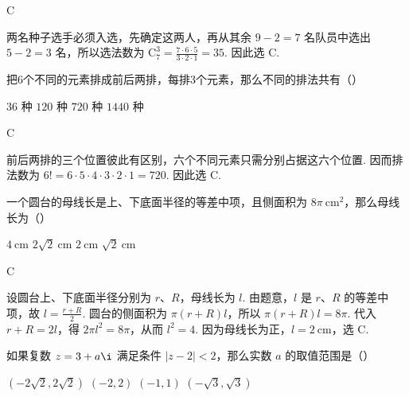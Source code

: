 \begin{answer}
C
\end{answer}

\begin{solution}
两名种子选手必须入选，先确定这两人，再从其余 \(9-2=7\) 名队员中选出 \(5-2=3\) 名，所以选法数为
\(\mathrm C_7^3=\frac{7\cdot6\cdot5}{3\cdot2\cdot1}=35\).
因此选 C.
\end{solution}

\begin{problem}
把6个不同的元素排成前后两排，每排3个元素，那么不同的排法共有（\quad）

\choices
    {\(36\) 种}
    {\(120\) 种}
    {\(720\) 种}
    {\(1440\) 种}
\end{problem}

\begin{answer}
C
\end{answer}

\begin{solution}
前后两排的三个位置彼此有区别，六个不同元素只需分别占据这六个位置. 因而排法数为
\(6!=6\cdot5\cdot4\cdot3\cdot2\cdot1=720\).
因此选 C.
\end{solution}

\begin{problem}
一个圆台的母线长是上、下底面半径的等差中项，且侧面积为 \(8\pi \mathrm{~cm}^2\)，那么母线长为（\quad）

\choices
    {\(4\mathrm{~cm}\)}
    {\(2\sqrt{2}\mathrm{~cm}\)}
    {\(2\mathrm{~cm}\)}
    {\(\sqrt{2}\mathrm{~cm}\)}
\end{problem}

\begin{answer}
C
\end{answer}

\begin{solution}
设圆台上、下底面半径分别为 \(r\)、\(R\)，母线长为 \(l\). 由题意，\(l\) 是 \(r\)、\(R\) 的等差中项，故
\(l=\frac{r+R}{2}\). 圆台的侧面积为 \(\pi(r+R)l\)，所以 \(\pi(r+R)l=8\pi\).
代入 \(r+R=2l\)，得 \(2\pi l^2=8\pi\)，从而 \(l^2=4\). 因为母线长为正，\(l=2\mathrm{~cm}\)，选 C.
\end{solution}

\begin{problem}
如果复数 \(z=3+a\i\) 满足条件 \(\left| z-2 \right|<2\)，那么实数 \(a\) 的取值范围是（\quad）

\choices
    {\((-2\sqrt{2}, 2\sqrt{2})\)}
    {\((-2,2)\)}
    {\((-1,1)\)}
    {\((-\sqrt{3}, \sqrt{3})\)}
\end{problem}

